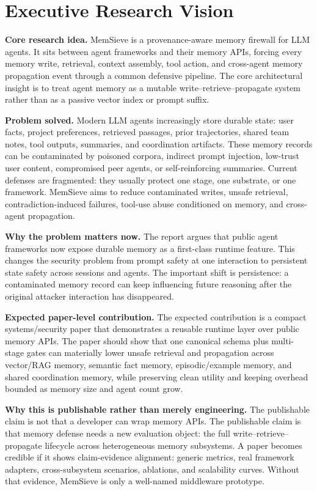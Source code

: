 \documentclass[11pt,oneside]{report}
\newcommand{\project}{MemSieve}
\begin{document}
\section{Executive Research Vision}

\textbf{Core research idea.} \project{} is a provenance-aware memory firewall for LLM agents. It sits
between agent frameworks and their memory APIs, forcing every memory write, retrieval, context
assembly, tool action, and cross-agent memory propagation event through a common defensive pipeline.
The core architectural insight is to treat agent memory as a mutable write--retrieve--propagate
system rather than as a passive vector index or prompt suffix.

\textbf{Problem solved.} Modern LLM agents increasingly store durable state: user facts, project
preferences, retrieved passages, prior trajectories, shared team notes, tool outputs, summaries, and
coordination artifacts. These memory records can be contaminated by poisoned corpora, indirect
prompt injection, low-trust user content, compromised peer agents, or self-reinforcing summaries.
Current defenses are fragmented: they usually protect one stage, one substrate, or one framework.
\project{} aims to reduce contaminated writes, unsafe retrieval, contradiction-induced failures,
tool-use abuse conditioned on memory, and cross-agent propagation.

\textbf{Why the problem matters now.} The report argues that public agent frameworks now expose
durable memory as a first-class runtime feature. This changes the security problem from prompt
safety at one interaction to persistent state safety across sessions and agents. The important
shift is persistence: a contaminated memory record can keep influencing future reasoning after the
original attacker interaction has disappeared.

\textbf{Expected paper-level contribution.} The expected contribution is a compact systems/security
paper that demonstrates a reusable runtime layer over public memory APIs. The paper should show that
one canonical schema plus multi-stage gates can materially lower unsafe retrieval and propagation
across vector/RAG memory, semantic fact memory, episodic/example memory, and shared coordination
memory, while preserving clean utility and keeping overhead bounded as memory size and agent count
grow.

\textbf{Why this is publishable rather than merely engineering.} The publishable claim is not that a
developer can wrap memory APIs. The publishable claim is that memory defense needs a new evaluation
object: the full write--retrieve--propagate lifecycle across heterogeneous memory subsystems. A
paper becomes credible if it shows claim-evidence alignment: generic metrics, real framework
adapters, cross-subsystem scenarios, ablations, and scalability curves. Without that evidence,
\project{} is only a well-named middleware prototype.
\end{document}
